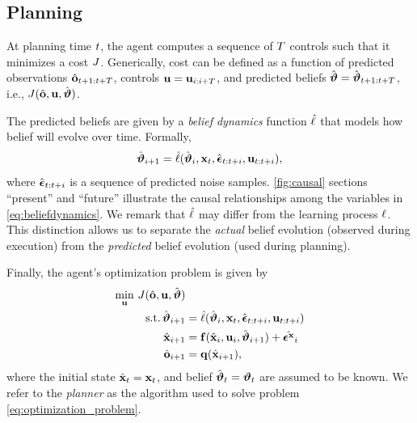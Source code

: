 \subsection{Planning}
At planning time $t$, the agent computes a sequence of $T$ controls such that it minimizes a cost $J$.
Generically, cost can be defined as a function of predicted observations $\hat{\mathbf{o}}_{t+1:t + T}$, controls $\mathbf{u} = \mathbf{u}_{i:i+T}$, and predicted beliefs $\hat{\boldsymbol{{\vartheta}}} = \hat{\boldsymbol{{\vartheta}}}_{t+1:t + T}$, i.e., $J(\hat{\mathbf{o}}, \mathbf{u}, \hat{\boldsymbol{{\vartheta}}})$.

The predicted beliefs are given by a \textit{belief dynamics} function $\hat{\mathbf{\ell}}$ that models how belief will evolve over time. 
Formally,
\begin{equation}
\label{eq:beliefdynamics}
    \hat{\boldsymbol{{\vartheta}}}_{i+1} = \hat{\mathbf{\ell}}(\hat{\boldsymbol{{\vartheta}}}_i, \mathbf{x}_t, \hat{\boldsymbol{\epsilon}}_{t:t+i}, \mathbf{u}_{t:t + i}),
\end{equation}
where $\hat{\boldsymbol{\epsilon}}_{t:t+i}$ is a sequence of predicted noise samples. 
\cref{fig:causal} sections ``present'' and ``future'' illustrate the causal relationships among the variables in \cref{eq:beliefdynamics}.
We remark that $\hat{\mathbf{\ell}}$ may differ from the learning process $\mathbf{\ell}$. 
This distinction allows us to separate the \textit{actual} belief evolution (observed during execution) from the \textit{predicted} belief evolution (used during planning). 

Finally, the agent's optimization problem is given by
\begin{subequations}
\label{eq:optimization_problem}
    \begin{align}
        \min_{\mathbf{u}} \, J(\hat{\mathbf{o}}, \mathbf{u}, \hat{\boldsymbol{{\vartheta}}})&\\
        \textrm{s.t.} \, \hat{\boldsymbol{{\vartheta}}}_{i+1} &= \hat{\mathbf{\ell}}(\hat{\boldsymbol{{\vartheta}}}_i, \mathbf{x}_t, \hat{\boldsymbol{\epsilon}}_{t:t+i}, \mathbf{u}_{t:t + i})\\
        \hat{\mathbf{x}}_{i+1} &= \mathbf{f}(\hat{\mathbf{x}}_{i}, \mathbf{u}_i, \hat{\boldsymbol{{\vartheta}}}_{i+1}) + \hat{\boldsymbol{\epsilon}^{\mathbf{x}}}_i\\
        \hat{\mathbf{o}}_{i+1} &= \mathbf{q}(\hat{\mathbf{x}}_{i+1}),
    \end{align}
\end{subequations}
where the initial state $\hat{\mathbf{x}}_t = \mathbf{x}_t$, and belief $\hat{\boldsymbol{{\vartheta}}}_t = \boldsymbol{{\vartheta}}_t$ are assumed to be known.
We refer to the \textit{planner} as the algorithm used to solve problem \eqref{eq:optimization_problem}.

